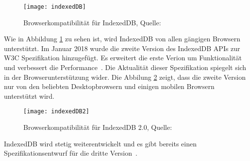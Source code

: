 \begin{figure}[H]
	\centering
	\texttt{[image: indexedDB]}
	\grayRule
	\caption[Browserkompatibilität für IndexedDB]{Browserkompatibilität für IndexedDB, Quelle: ~\cite{caniuse-idb}}
	\label{fig:indexedDB}
\end{figure}
Wie in Abbildung \ref{fig:indexedDB} zu sehen ist, wird IndexedDB von allen gängigen Browsern unterstützt. 
%
Im Januar 2018 wurde die zweite Version des IndexedDB \glspl{API} zur W3C Spezifikation hinzugefügt. Es erweitert die erste Verion um Funktionalität und verbessert die Performance~\cite{idb2}.
Die Aktualität dieser Spezifikation spiegelt sich in der Browserunterstützung wider. Die Abbilung \ref{fig:indexedDB2} zeigt, dass die zweite Version nur von den beliebten  Desktopbrowsern und einigen mobilen Browsern unterstützt wird. 
\begin{figure}[H]
	\centering
	\texttt{[image: indexedDB2]}
	\grayRule
	\caption[Browserkompatibilität für IndexedDB 2.0]{Browserkompatibilität für IndexedDB 2.0, Quelle: ~\cite{caniuse-idb}}
	\label{fig:indexedDB2}
\end{figure}
IndexedDB wird stetig weiterentwickelt und es gibt bereits einen Spezifikationsentwurf für die dritte Version~\cite{idb3}. 